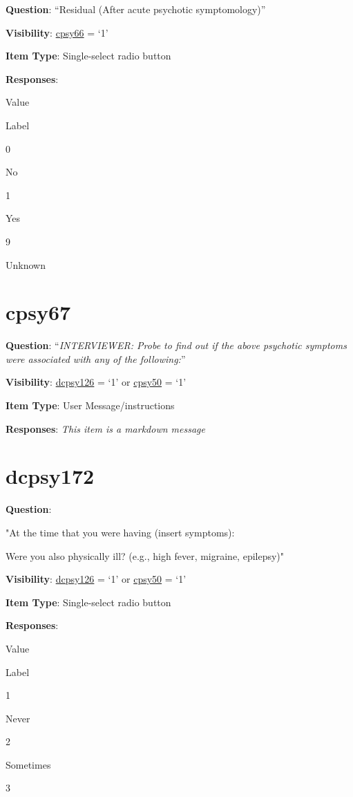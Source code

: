 \documentclass[]{book}
\begin{document}
\textbf{Question}: ``Residual (After acute psychotic symptomology)''

\textbf{Visibility}: \protect\hyperlink{cpsy66}{cpsy66} = `1'

\textbf{Item Type}: Single-select radio button

\textbf{Responses}:

Value

Label

0

No

1

Yes

9

Unknown

\hypertarget{cpsy67}{%
\section{cpsy67}\label{cpsy67}}

\textbf{Question}: ``\emph{INTERVIEWER: Probe to find out if the above psychotic symptoms were associated with any of the following:}''

\textbf{Visibility}: \protect\hyperlink{dcpsy126}{dcpsy126} = `1' or \protect\hyperlink{cpsy50}{cpsy50} = `1'

\textbf{Item Type}: User Message/instructions

\textbf{Responses}: \emph{This item is a markdown message}

\hypertarget{dcpsy172}{%
\section{dcpsy172}\label{dcpsy172}}

\textbf{Question}:

"At the time that you were having (insert symptoms):

Were you also physically ill? (e.g., high fever, migraine, epilepsy)"

\textbf{Visibility}: \protect\hyperlink{dcpsy126}{dcpsy126} = `1' or \protect\hyperlink{cpsy50}{cpsy50} = `1'

\textbf{Item Type}: Single-select radio button

\textbf{Responses}:

Value

Label

1

Never

2

Sometimes

3
\end{document}

